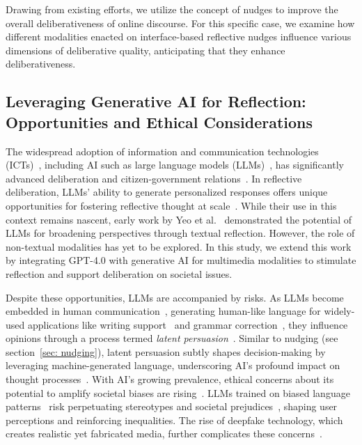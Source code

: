 Drawing from existing efforts, we utilize the concept of nudges to improve the overall deliberativeness of online discourse. For this specific case, we examine how different modalities enacted on interface-based reflective nudges influence various dimensions of deliberative quality, anticipating that they enhance deliberativeness.

\subsection{Leveraging Generative AI for Reflection: Opportunities and Ethical Considerations}
The widespread adoption of information and communication technologies (ICTs)~\cite{janssen2018innovating}, including AI such as large language models (LLMs)~\cite{duberry2022artificial}, has significantly advanced deliberation and citizen-government relations~\cite{duberry2022artificial, lovejoy2012information, misuraca2020ai, mehr2017artificial, chun2012social, leach2010dynamic}. In reflective deliberation, LLMs' ability to generate personalized responses offers unique opportunities for fostering reflective thought at scale~\cite{duberry2022artificial, fogg2002persuasive, jakesch2023co}. While their use in this context remains nascent, early work by Yeo et al.~\cite{yeo2024help} demonstrated the potential of LLMs for broadening perspectives through textual reflection. However, the role of non-textual modalities has yet to be explored. In this study, we extend this work by integrating GPT-4.0 with generative AI for multimedia modalities to stimulate reflection and support deliberation on societal issues.

Despite these opportunities, LLMs are accompanied by risks. As LLMs become embedded in human communication~\cite{bommasani2021opportunities}, generating human-like language for widely-used applications like writing support~\cite{dang2022beyond, jakesch2023co, hancock2020ai} and grammar correction~\cite{koltovskaia2020student}, they influence opinions through a process termed \textit{latent persuasion}~\cite{jakesch2023co}. Similar to nudging (see section~\ref{sec: nudging}), latent persuasion subtly shapes decision-making by leveraging machine-generated language, underscoring AI's profound impact on thought processes~\cite{fogg2002persuasive, leonard2008richard}. With AI's growing prevalence, ethical concerns about its potential to amplify societal biases are rising~\cite{stahl2016ethics}. LLMs trained on biased language patterns~\cite{caliskan2017semantics, bolukbasi2016man, duberry2022artificial} risk perpetuating stereotypes and societal prejudices~\cite{brown2020language, lucy2021gender, huang2019reducing, nozza2021honest, johnson2022ghost, langer2023trust, bowen2006information, labajova2023state, cotter2019playing}, shaping user perceptions and reinforcing inequalities. The rise of deepfake technology, which creates realistic yet fabricated media, further complicates these concerns~\cite{karnouskos2020artificial, verdoliva2020media}.

